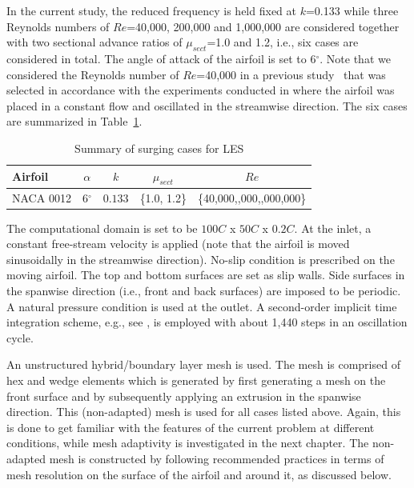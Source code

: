 In the current study, the reduced frequency is held fixed at $k$=0.133 while three Reynolds numbers of $Re$=40,000, 200,000 and 1,000,000 are considered together with two sectional advance ratios of $\mu_{sect}$=1.0 and 1.2, i.e., six cases are considered in total.
The angle of attack of the airfoil is set to 6$^\circ$.
Note that we considered the Reynolds number of $Re$=40,000 in a previous study~\cite{bib:kocher_scitech2017} that was selected in accordance with the experiments conducted in \cite{bib:granlund2016} where the airfoil was placed in a constant flow and oscillated in the streamwise direction.
The six cases are summarized in Table~\ref{table:summary_cases}.

\begin{table}[H]
\centering
\caption{Summary of surging cases for LES}
\label{table:summary_cases}
\begin{tabular}{|l|c|c|c|c|}
\hline
Airfoil   & $\alpha$ & $k$ & $\mu_{sect}$ & $Re$ \\
\hline
\hline
NACA 0012 & 6$^\circ$ & $0.133$ & \{1.0, 1.2\} & \{40,000,\; 200,000,\; 1,000,000\} \\
\hline
\end{tabular}
\end{table}

The computational domain is set to be $100C$ x $50C$ x $0.2C$.
At the inlet, a constant free-stream velocity is applied
(note that the airfoil is moved sinusoidally in the streamwise direction).
No-slip condition is prescribed on the moving airfoil.
The top and bottom surfaces are set as slip walls.
Side surfaces in the spanwise direction (i.e., front and back surfaces) are imposed to be periodic.
A natural pressure condition is used at the outlet.
A second-order implicit time integration scheme, e.g., see \cite{bib:tran2017b}, is employed with about 1,440 steps in an oscillation cycle.

An unstructured hybrid/boundary layer mesh is used.
The mesh is comprised of hex and wedge elements which is generated by first generating a mesh on the front surface and by subsequently applying an extrusion in the spanwise direction. This (non-adapted) mesh is used for all cases listed above. Again, this is done to get familiar with the features of the current problem at different conditions, while mesh adaptivity is investigated in the next chapter. The non-adapted mesh is constructed by following recommended practices in terms of mesh resolution on the surface of the airfoil and around it, as discussed below.

